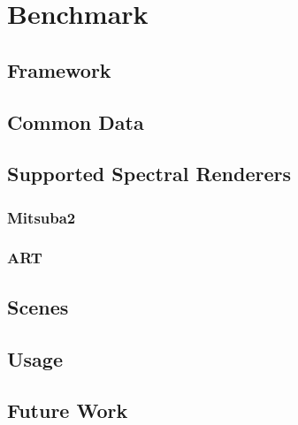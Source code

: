 \chapter{Benchmark}

\section{Framework}

\section{Common Data}

\section{Supported Spectral Renderers}

\subsection{Mitsuba2}

\subsection{ART}

\section{Scenes}

\section{Usage}

\section{Future Work}